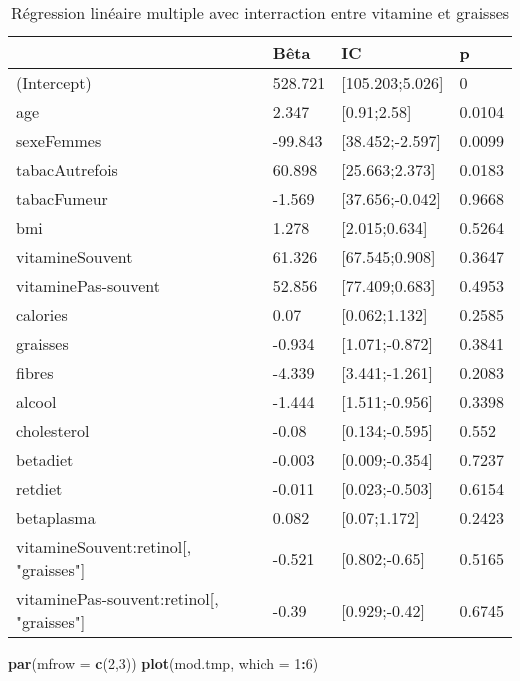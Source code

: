 \documentclass[]{article}
\newenvironment{Shaded}{\begin{snugshade}}{\end{snugshade}}
\newcommand{\KeywordTok}[1]{\textcolor[rgb]{0.13,0.29,0.53}{\textbf{#1}}}
\newcommand{\DataTypeTok}[1]{\textcolor[rgb]{0.13,0.29,0.53}{#1}}
\newcommand{\DecValTok}[1]{\textcolor[rgb]{0.00,0.00,0.81}{#1}}
\newcommand{\OperatorTok}[1]{\textcolor[rgb]{0.81,0.36,0.00}{\textbf{#1}}}
\newcommand{\NormalTok}[1]{#1}
\begin{document}
\begin{table}

\caption{\label{tab:unnamed-chunk-73}Régression linéaire multiple avec interraction entre vitamine et graisses}
\centering
\begin{tabular}[t]{l|l|l|l}
\hline
  & Bêta & IC & p\\
\hline
\rowcolor[HTML]{BBD2E1}  (Intercept) & 528.721 & [105.203;5.026] & 0\\
\hline
age & 2.347 & [0.91;2.58] & 0.0104\\
\hline
\rowcolor[HTML]{BBD2E1}  sexeFemmes & -99.843 & [38.452;-2.597] & 0.0099\\
\hline
tabacAutrefois & 60.898 & [25.663;2.373] & 0.0183\\
\hline
\rowcolor[HTML]{BBD2E1}  tabacFumeur & -1.569 & [37.656;-0.042] & 0.9668\\
\hline
bmi & 1.278 & [2.015;0.634] & 0.5264\\
\hline
\rowcolor[HTML]{BBD2E1}  vitamineSouvent & 61.326 & [67.545;0.908] & 0.3647\\
\hline
vitaminePas-souvent & 52.856 & [77.409;0.683] & 0.4953\\
\hline
\rowcolor[HTML]{BBD2E1}  calories & 0.07 & [0.062;1.132] & 0.2585\\
\hline
graisses & -0.934 & [1.071;-0.872] & 0.3841\\
\hline
\rowcolor[HTML]{BBD2E1}  fibres & -4.339 & [3.441;-1.261] & 0.2083\\
\hline
alcool & -1.444 & [1.511;-0.956] & 0.3398\\
\hline
\rowcolor[HTML]{BBD2E1}  cholesterol & -0.08 & [0.134;-0.595] & 0.552\\
\hline
betadiet & -0.003 & [0.009;-0.354] & 0.7237\\
\hline
\rowcolor[HTML]{BBD2E1}  retdiet & -0.011 & [0.023;-0.503] & 0.6154\\
\hline
betaplasma & 0.082 & [0.07;1.172] & 0.2423\\
\hline
\rowcolor[HTML]{BBD2E1}  vitamineSouvent:retinol[, "graisses"] & -0.521 & [0.802;-0.65] & 0.5165\\
\hline
vitaminePas-souvent:retinol[, "graisses"] & -0.39 & [0.929;-0.42] & 0.6745\\
\hline
\end{tabular}
\end{table}

\begin{Shaded}
\begin{Highlighting}[]
\KeywordTok{par}\NormalTok{(}\DataTypeTok{mfrow =} \KeywordTok{c}\NormalTok{(}\DecValTok{2}\NormalTok{,}\DecValTok{3}\NormalTok{))}
\KeywordTok{plot}\NormalTok{(mod.tmp, }\DataTypeTok{which =} \DecValTok{1}\OperatorTok{:}\DecValTok{6}\NormalTok{)}
\end{Highlighting}
\end{Shaded}
\end{document}
